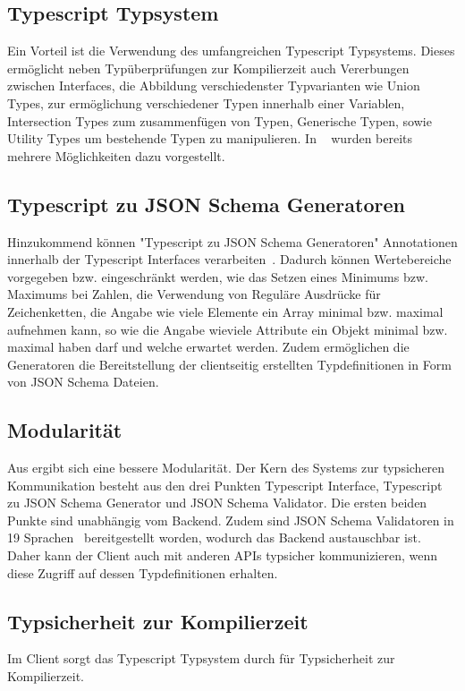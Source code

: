 \subsection{Typescript Typsystem}
\label{sec:requirements:pros:typescript}
Ein Vorteil ist die Verwendung des umfangreichen Typescript Typsystems.
Dieses ermöglicht neben Typüberprüfungen zur Kompilierzeit auch Vererbungen zwischen Interfaces, die Abbildung verschiedenster Typvarianten wie
Union Types, zur ermöglichung verschiedener Typen innerhalb einer Variablen, Intersection Types zum zusammenfügen von Typen,
Generische Typen, sowie Utility Types um bestehende Typen zu manipulieren.
In ~ wurden bereits mehrere Möglichkeiten dazu vorgestellt.

\subsection{Typescript zu JSON Schema Generatoren}
\label{sec:requirements:pros:generation}
Hinzukommend können "Typescript zu JSON Schema Generatoren" Annotationen innerhalb der Typescript Interfaces verarbeiten~\cite{json-schema-generator-annotations}.
Dadurch können Wertebereiche vorgegeben bzw. eingeschränkt werden,
wie das Setzen eines Minimums bzw. Maximums bei Zahlen, die Verwendung von Reguläre Ausdrücke für Zeichenketten,
die Angabe wie viele Elemente ein Array minimal bzw. maximal aufnehmen kann,
so wie die Angabe wieviele Attribute ein Objekt minimal bzw. maximal haben darf und welche erwartet werden.
Zudem ermöglichen die Generatoren die Bereitstellung der clientseitig erstellten Typdefinitionen in Form von JSON Schema Dateien.

\subsection{Modularität}
\label{sec:requirements:pros:modul}
Aus  ergibt sich eine bessere Modularität.
Der Kern des Systems zur typsicheren Kommunikation besteht aus den drei Punkten Typescript Interface, Typescript zu JSON Schema Generator und
JSON Schema Validator. Die ersten beiden Punkte sind unabhängig vom Backend.
Zudem sind JSON Schema Validatoren in 19 Sprachen~\cite{json-schema-implementations} bereitgestellt worden, wodurch das Backend austauschbar ist.
Daher kann der Client auch mit anderen APIs typsicher kommunizieren, wenn diese Zugriff auf dessen Typdefinitionen erhalten.

\subsection{Typsicherheit zur Kompilierzeit}
\label{sec:requirements:pros:typesafe-compile}
Im Client sorgt das Typescript Typsystem durch für Typsicherheit zur Kompilierzeit.

